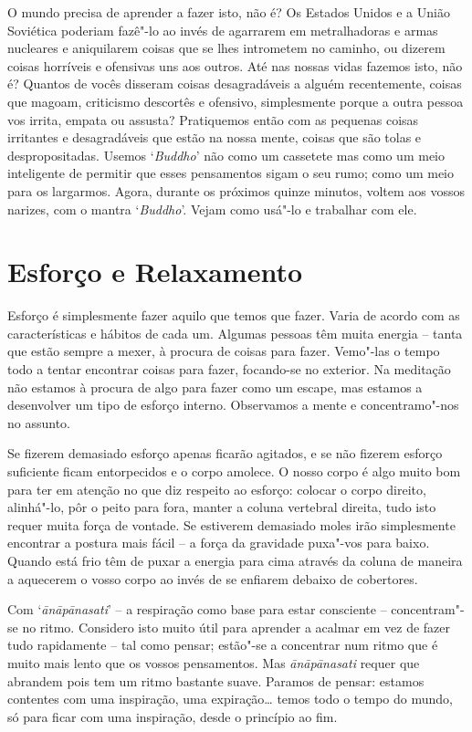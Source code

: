O mundo precisa de aprender a fazer isto, não é? Os Estados Unidos e a
União Soviética poderiam fazê"-lo ao invés de agarrarem em metralhadoras
e armas nucleares e aniquilarem coisas que se lhes intrometem no
caminho, ou dizerem coisas horríveis e ofensivas uns aos outros. Até nas
nossas vidas fazemos isto, não é? Quantos de vocês disseram
coisas desagradáveis a alguém recentemente, coisas que magoam,
criticismo descortês e ofensivo, simplesmente porque a outra pessoa vos
irrita, empata ou assusta? Pratiquemos então com as pequenas coisas
irritantes e desagradáveis que estão na nossa mente, coisas que são
tolas e despropositadas. Usemos `\emph{Buddho}' não como um cassetete mas 
como um meio inteligente de permitir que esses pensamentos sigam o seu 
rumo; como um meio para os largarmos. Agora, durante os próximos quinze
minutos, voltem aos vossos narizes, com o mantra `\emph{Buddho}'. Vejam
como usá"-lo e trabalhar com ele.

\chapter{Esforço e Relaxamento}

Esforço é simplesmente fazer aquilo que temos que fazer. Varia de acordo
com as características e hábitos de cada um. Algumas pessoas têm muita
energia -- tanta que estão sempre a mexer, à procura de coisas para
fazer. Vemo"-las o tempo todo a tentar encontrar coisas para fazer,
focando-se no exterior. Na meditação não estamos à procura de algo
para fazer como um escape, mas estamos a desenvolver um tipo de esforço
interno. Observamos a mente e concentramo"-nos no assunto.

Se fizerem demasiado esforço apenas ficarão agitados, e se não fizerem
esforço suficiente ficam entorpecidos e o corpo amolece. O nosso corpo é
algo muito bom para ter em atenção no que diz respeito ao esforço:
colocar o corpo direito, alinhá"-lo, pôr o peito para fora, manter a
coluna vertebral direita, tudo isto requer muita força de vontade. Se
estiverem demasiado moles irão simplesmente encontrar a postura mais
fácil -- a força da gravidade puxa"-vos para baixo. Quando está frio têm
de puxar a energia para cima através da coluna de maneira a aquecerem o
vosso corpo ao invés de se enfiarem debaixo de cobertores.

Com `\emph{ānāpānasati}' --  a respiração como base para estar
consciente -- concentram"-se no ritmo. Considero isto muito útil para
aprender a acalmar em vez de fazer tudo rapidamente -- tal como pensar;
estão"-se a concentrar num ritmo que é muito mais lento que os vossos
pensamentos. Mas \emph{ānāpānasati} requer que abrandem pois tem um
ritmo bastante suave. Paramos de pensar: estamos contentes com uma
inspiração, uma expiração\ldots{} temos todo o tempo do mundo, só para 
ficar com uma inspiração, desde o princípio ao fim.

